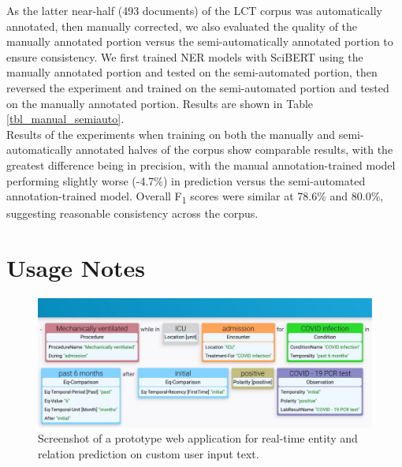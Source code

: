 \documentclass[fleqn,10pt]{wlscirep}
\begin{document}
\noindent As the latter near-half (493 documents) of the LCT corpus was automatically annotated, then manually corrected, we also evaluated the quality of the manually annotated portion versus the semi-automatically annotated portion to ensure consistency. We first trained NER models with SciBERT using the manually annotated portion and tested on the semi-automated portion, then reversed the experiment and trained on the semi-automated portion and tested on the manually annotated portion. Results are shown in Table \ref{tbl_manual_semiauto}. \\

\noindent Results of the experiments when training on both the manually and semi-automatically annotated halves of the corpus show comparable results, with the greatest difference being in precision, with the manual annotation-trained model performing slightly worse (-4.7\%) in prediction versus the semi-automated annotation-trained model. Overall F\textsubscript{1} scores were similar at 78.6\% and 80.0\%, suggesting reasonable consistency across the corpus.

\section*{Usage Notes}
\label{sec:usage_notes}
\begin{figure}[p]
\centering
  \includegraphics[scale=0.6]{leafai2.pdf}  
\caption{Screenshot of a prototype web application for real-time entity and relation prediction on custom user input text.}
\label{fig_leafai}
\end{figure}
\end{document}
